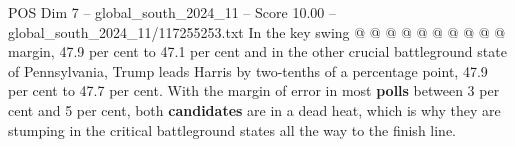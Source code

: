 \begin{textsample}{POS Dim 7 – global\_south\_2024\_11 – Score 10.00 – global\_south\_2024\_11/117255253.txt}
In the key swing @ @ @ @ @ @ @ @ @ @ margin, 47.9 per cent to 47.1 per cent and in the other crucial battleground state of Pennsylvania, Trump leads Harris by two-tenths of a percentage point, 47.9 per cent to 47.7 per cent.
With the margin of error in most \textbf{polls} between 3 per cent and 5 per cent, both \textbf{candidates} are in a dead heat, which is why they are stumping in the critical battleground states all the way to the finish line.

\end{textsample}
